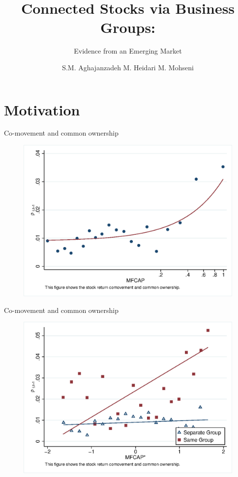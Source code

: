 \documentclass{beamer}
\title[Connected Stocks  via Business Groups]{Connected Stocks via Business Groups:}
\subtitle{Evidence from an Emerging Market}
\author[Aghajanzadeh, Heidari \& Mohseni]{S.M. Aghajanzadeh \qquad M. Heidari \qquad M. Mohseni }
\institute[TeIAS]{Tehran Institute for Advanced Studies }
\begin{document}
	\maketitle
	
	
	
	\section{Motivation}
	
		\begin{frame}{Co-movement and common ownership}
				\begin{figure}
						\centering  
						\includegraphics[width=0.85\linewidth]{"Output/mcorr50.eps"}
					\end{figure}
			\end{frame}   
		
			\begin{frame}{Co-movement and common ownership}
					\begin{figure}
							\centering  
							\includegraphics[width=0.85\linewidth]{"Output/mcorr5bg.eps"}
						\end{figure}
				\end{frame}   
	
\end{document}
